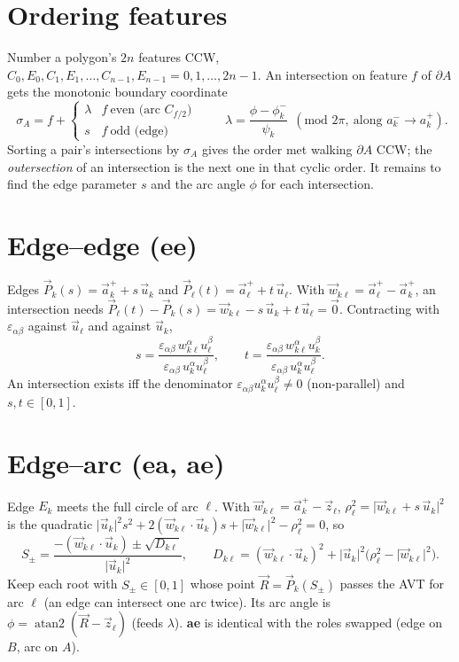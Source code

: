 \documentclass[11pt]{article}
\newcommand{\vv}[1]{\vec{#1}}
\DeclareMathOperator{\atantwo}{atan2}
\begin{document}
\section{Ordering features}

Number a polygon's $2n$ features CCW, $C_0,E_0,C_1,E_1,\dots,C_{n-1},E_{n-1}=0,1,\dots,2n-1$.
An intersection on feature $f$ of $\partial A$ gets the monotonic boundary coordinate
\[
  \boxed{\;\sigma_A = f +
  \begin{cases}\lambda & f\ \text{even (arc $C_{f/2}$)}\\[2pt] s & f\ \text{odd (edge)}\end{cases}\;}
  \qquad
  \lambda=\frac{\phi-\phi^{-}_k}{\psi_k}\ \ (\text{mod }2\pi,\ \text{along }a^{-}_k\!\to a^{+}_k).
\]
Sorting a pair's intersections by $\sigma_A$ gives the order met walking $\partial A$ CCW; the
\emph{outersection} of an intersection is the next one in that cyclic order. It remains to find the
edge parameter $s$ and the arc angle $\phi$ for each intersection.

\section{Edge--edge (ee)}

Edges $\vv P_k(s)=\vv a^{+}_k+s\,\vv u_k$ and $\vv P_\ell(t)=\vv a^{+}_\ell+t\,\vv u_\ell$. With
$\vv w_{k\ell}=\vv a^{+}_\ell-\vv a^{+}_k$, an intersection needs
$\vv P_\ell(t)-\vv P_k(s)=\vv w_{k\ell}-s\,\vv u_k+t\,\vv u_\ell=\vv 0$. Contracting with
$\varepsilon_{\alpha\beta}$ against $\vv u_\ell$ and against $\vv u_k$,
\[
  s=\frac{\varepsilon_{\alpha\beta}\,w_{k\ell}^{\alpha}u_\ell^{\beta}}
         {\varepsilon_{\alpha\beta}\,u_k^{\alpha}u_\ell^{\beta}},
  \qquad
  t=\frac{\varepsilon_{\alpha\beta}\,w_{k\ell}^{\alpha}u_k^{\beta}}
         {\varepsilon_{\alpha\beta}\,u_k^{\alpha}u_\ell^{\beta}}.
\]
An intersection exists iff the denominator $\varepsilon_{\alpha\beta}u_k^{\alpha}u_\ell^{\beta}\neq0$
(non-parallel) and $s,t\in[0,1]$.

\section{Edge--arc (ea, ae)}

Edge $E_k$ meets the full circle of arc $\ell$. With $\vv w_{k\ell}=\vv a^{+}_k-\vv z_\ell$,
$\rho_\ell^{2}=\lvert\vv w_{k\ell}+s\,\vv u_k\rvert^{2}$ is the quadratic
$\lvert\vv u_k\rvert^{2}s^{2}+2(\vv w_{k\ell}\!\cdot\!\vv u_k)s+\lvert\vv w_{k\ell}\rvert^{2}-\rho_\ell^{2}=0$, so
\[
  \boxed{\;S_{\pm}=\frac{-(\vv w_{k\ell}\!\cdot\!\vv u_k)\pm\sqrt{D_{k\ell}}}{\lvert\vv u_k\rvert^{2}},
  \qquad
  D_{k\ell}=(\vv w_{k\ell}\!\cdot\!\vv u_k)^{2}+\lvert\vv u_k\rvert^{2}\big(\rho_\ell^{2}-\lvert\vv w_{k\ell}\rvert^{2}\big).\;}
\]
Keep each root with $S_{\pm}\in[0,1]$ whose point $\vv R=\vv P_k(S_{\pm})$ passes the AVT for arc
$\ell$ (an edge can intersect one arc twice). Its arc angle is $\phi=\atantwo(\vv R-\vv z_\ell)$
(feeds $\lambda$). \textbf{ae} is identical with the roles swapped (edge on $B$, arc on $A$).
\end{document}
